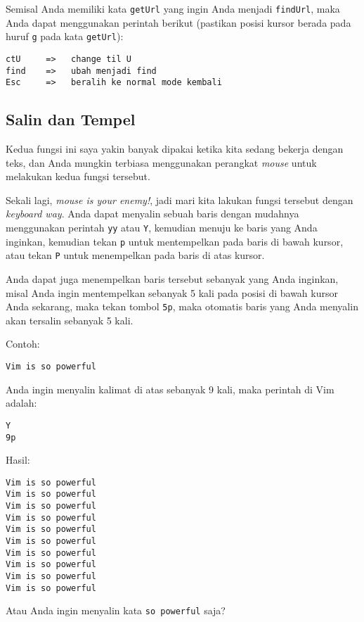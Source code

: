 \documentclass{article}
\begin{document}
Semisal Anda memiliki kata \verb=getUrl= yang ingin Anda
menjadi \verb=findUrl=, maka Anda dapat menggunakan perintah
berikut (pastikan posisi kursor berada pada huruf \verb=g=
pada kata \verb=getUrl=):

\begin{verbatim}
ctU     =>   change til U
find    =>   ubah menjadi find
Esc     =>   beralih ke normal mode kembali 
\end{verbatim}

\subsection{Salin dan Tempel}

Kedua fungsi ini saya yakin banyak dipakai ketika kita
sedang bekerja dengan teks, dan Anda mungkin terbiasa
menggunakan perangkat \emph{mouse} untuk melakukan kedua
fungsi tersebut.

Sekali lagi, \emph{mouse is your enemy!}, jadi mari kita
lakukan fungsi tersebut dengan \emph{keyboard way}.  Anda
dapat menyalin sebuah baris dengan mudahnya menggunakan
perintah \verb=yy= atau \verb=Y=, kemudian menuju ke baris
yang Anda inginkan, kemudian tekan \verb=p= untuk
mentempelkan pada baris di bawah kursor, atau tekan \verb=P=
untuk menempelkan pada baris di atas kursor.

Anda dapat juga menempelkan baris tersebut sebanyak yang
Anda inginkan, misal Anda ingin mentempelkan sebanyak 5 kali
pada posisi di bawah kursor Anda sekarang, maka tekan tombol
\verb=5p=, maka otomatis baris yang Anda menyalin akan
tersalin sebanyak 5 kali. 

Contoh:

\begin{verbatim}
Vim is so powerful
\end{verbatim}

Anda ingin menyalin kalimat di atas sebanyak 9 kali, maka
perintah di Vim adalah:

\begin{verbatim}
Y
9p
\end{verbatim}

Hasil:

\begin{verbatim}
Vim is so powerful
Vim is so powerful
Vim is so powerful
Vim is so powerful
Vim is so powerful
Vim is so powerful
Vim is so powerful
Vim is so powerful
Vim is so powerful
Vim is so powerful
\end{verbatim}

Atau Anda ingin menyalin kata \verb=so powerful= saja?
\end{document}
